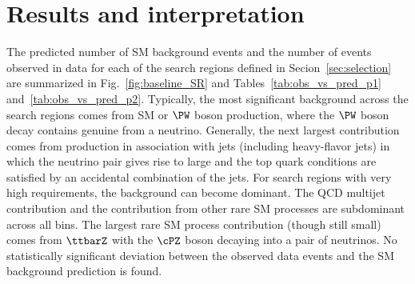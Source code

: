 \section{Results and interpretation}
\label{sec:results}

The predicted number of SM background events and the number of events observed in data for each of the search regions defined in Secion~\ref{sec:selection} are summarized in Fig.~\ref{fig:baseline_SR} and Tables~\ref{tab:obs_vs_pred_p1} and~\ref{tab:obs_vs_pred_p2}.
Typically, the most significant background across the search regions comes from SM \ttbar or $\PW$ boson production, where the $\PW$ boson decay contains genuine \met from a neutrino.
Generally, the next largest contribution comes from \znunu production in association with jets (including heavy-flavor jets) in which the neutrino pair gives rise to large \met and the top quark conditions are satisfied by an accidental combination of the jets.
For search regions with very high \met requirements, the \znunu background can become dominant.
The QCD multijet contribution and the contribution from other rare SM processes are subdominant across all bins. The largest rare SM process contribution (though still small) comes from $\ttbarZ$ with the $\cPZ$ boson decaying into a pair of neutrinos.
No statistically significant deviation between the observed data events and the SM background prediction is found.


